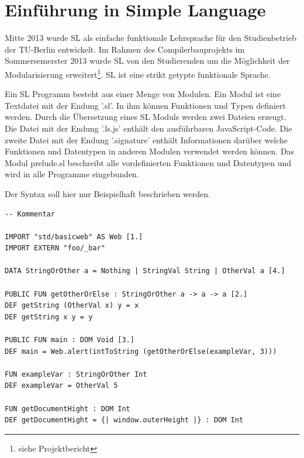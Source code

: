 \documentclass[12pt]{scrreprt}
\begin{document}
\chapter{ Einführung in Simple Language}

Mitte 2013 wurde \ac{SL} als einfache funktionale Lehrsprache für den Studienbetrieb der TU-Berlin entwickelt. Im Rahmen des Compilerbauprojekts im Sommersemerster 2013 wurde \ac{SL} von den Studierenden um die Möglichkeit der Modularisierung erweitert\footnote{siehe Projektbericht}. \ac{SL} ist eine strikt getypte funktionale Sprache.

Ein \ac{SL} Programm besteht aus einer Menge von Modulen. Ein Modul ist eine Textdatei mit der Endung '.sl'. In ihm können Funktionen und Typen definiert werden. Durch die Übersetzung eines \ac{SL} Moduls werden zwei Dateien erzeugt. Die Datei mit der Endung '.ls.js' enthält den ausführbaren JavaScript-Code. Die zweite Datei mit der Endung '.signature' enthält Informationen darüber welche Funktionen und Datentypen in anderen Modulen verwendet werden können. Das Modul prelude.sl beschreibt alle vordefinierten Funktionen und Datentypen und wird in alle Programme eingebunden. 

Der Syntax soll hier nur Beispielhaft beschrieben werden.

\begin{lstlisting}[caption=Beispielmodul, label=lst:bsp1]
-- Kommentar

IMPORT "std/basicweb" AS Web [1.]
IMPORT EXTERN "foo/_bar"

DATA StringOrOther a = Nothing | StringVal String | OtherVal a [4.]

PUBLIC FUN getOtherOrElse : StringOrOther a -> a -> a [2.]
DEF getString (OtherVal x) y = x
DEF getString x y = y

PUBLIC FUN main : DOM Void [3.]
DEF main = Web.alert(intToString (getOtherOrElse(exampleVar, 3)))

FUN exampleVar : StringOrOther Int
DEF exampleVar = OtherVal 5

FUN getDocumentHight : DOM Int
DEF getDocumentHight = {| window.outerHeight |} : DOM Int

\end{lstlisting}
\end{document}

